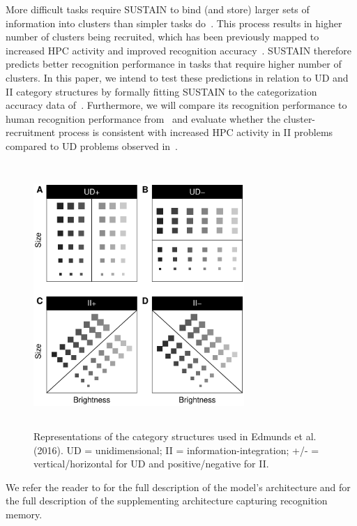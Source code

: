 \documentclass[10pt,letterpaper]{article}
\begin{document}
More difficult tasks require SUSTAIN to bind (and store) larger sets of
information into clusters than simpler tasks do~\cite{Love2004}. This process
results in higher number of clusters being recruited, which has been previously
mapped to increased HPC activity and improved recognition accuracy~\cite{Love2007}.
SUSTAIN therefore predicts better recognition performance in tasks that
require higher number of clusters. In this paper, we intend to test these
predictions in relation to UD and II category structures by formally fitting
SUSTAIN to the categorization accuracy data
of~. Furthermore, we will compare its recognition performance
to human recognition performance from~
and evaluate whether the cluster-recruitment process is consistent with increased
HPC activity in II problems compared to UD problems observed in~.

\begin{figure}[h]
    \centering
    \includegraphics[width=8cm,
  height=10cm,
  keepaspectratio,]{pdf/categoryStructures.pdf}
  \caption{Representations of the category structures used in Edmunds et al. (2016).
    UD = unidimensional; II = information-integration; +/- = vertical/horizontal
    for UD and positive/negative for II.}
   \label{fig:structures}
\end{figure}

We refer the reader to  for the full description of the
model's architecture and  for the full description of the
supplementing architecture capturing recognition memory.
\end{document}
